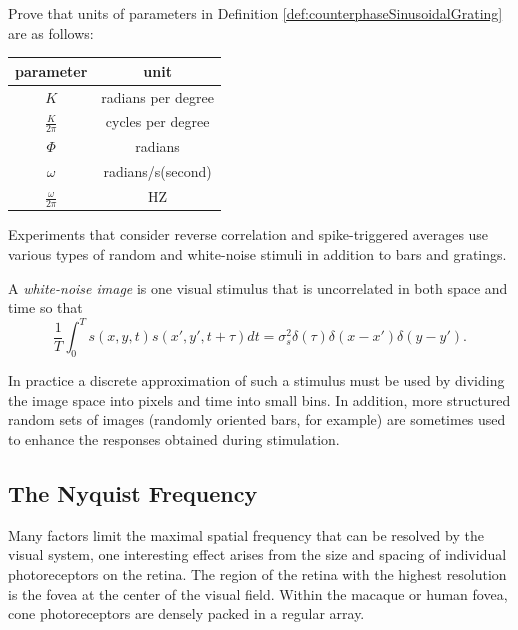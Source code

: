 \begin{exc}
  Prove that units of parameters in Definition \ref{def:counterphaseSinusoidalGrating} are as follows:
  \begin{center}
    \renewcommand\arraystretch{1.8}
    \begin{tabular}[h]{|c|c|}
      \hline
      parameter & unit \\
      \hline
      $K$ & radians per degree\\
      \hline
      $\frac{K}{2\pi}$ & cycles per degree \\
      \hline
      $\Phi$ & radians \\
      \hline
      $\omega$ & radians/s(second) \\
      \hline
      $\frac{\omega}{2\pi}$ & HZ \\
      \hline
    \end{tabular}
  \end{center}
\end{exc}

\begin{rem}
  Experiments that consider reverse correlation and spike-triggered averages use various types of random and white-noise stimuli in addition to bars and gratings.
\end{rem}

\begin{defn}
  \label{def:whiteNoiseImage}
  A \emph{white-noise image} is one visual stimulus that is uncorrelated in both space and time so that
  \begin{equation}
    \label{equ:2.19}
    \frac{1}{T}\int_0^Ts(x,y,t)s(x',y',t+\tau)dt = \sigma_s^2\delta(\tau)\delta(x-x')\delta(y-y').
  \end{equation}
\end{defn}

\begin{rem}
  In practice a discrete approximation of such a stimulus must be used by dividing the image space into pixels and time into small bins. In addition, more structured random sets of images (randomly oriented bars, for example) are sometimes used to enhance the responses obtained during stimulation.
\end{rem}

\subsection{The Nyquist Frequency}
\label{sec:NyquistFrequency}
\begin{rem}
  Many factors limit the maximal spatial frequency that can be resolved by the visual system, one interesting effect arises from the size and spacing of individual photoreceptors on the retina.  The region of the retina with the highest resolution is the fovea at the center of the visual field. Within the macaque or human fovea, cone photoreceptors are densely packed in a regular array.
\end{rem}


